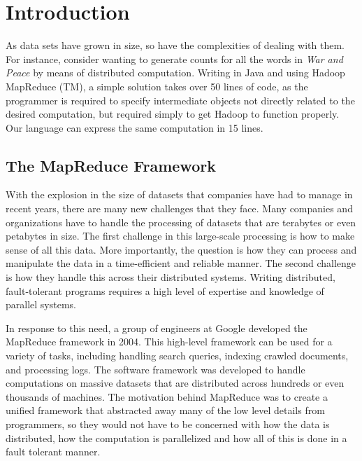\documentclass{book}
\begin{document}
\section{Introduction}
\label{sec:introduction}

As data sets have grown in size, so have the complexities of dealing with them.
For instance, consider wanting to generate counts for all the words in \emph{War
and Peace} by means of distributed computation. Writing in Java and using Hadoop
MapReduce (TM), a simple solution takes over 50 lines of code, as the programmer
is required to specify intermediate objects not directly related to the desired
computation, but required simply to get Hadoop to function properly. Our language 
can express the same computation in 15 lines.

\subsection{The MapReduce Framework}
\label{sub:mapreduce}

With the explosion in the size of datasets that companies have had to manage in
recent years, there are many new challenges that they face. Many companies and
organizations have to handle the processing of datasets that are terabytes or even
petabytes in size. The first challenge in this large-scale processing is how to
make sense of all this data. More importantly, the question is how they can 
process and manipulate the data in a time-efficient and reliable manner. 
The second challenge is how they handle this across their distributed systems. Writing distributed, fault-tolerant programs requires a high level of expertise and knowledge of parallel systems.

In response to this need, a group of engineers at Google developed the MapReduce
framework in 2004. This high-level framework can be used for a variety of
tasks, including handling search queries, indexing crawled documents, and
processing logs. The software framework was developed to handle computations on
massive datasets that are distributed across hundreds or even thousands of
machines. The motivation behind MapReduce was to create a unified framework that
abstracted away many of the low level details from programmers, so they would not
have to be concerned with how the data is distributed, how the computation is
parallelized and how all of this is done in a fault tolerant manner.
\end{document}
